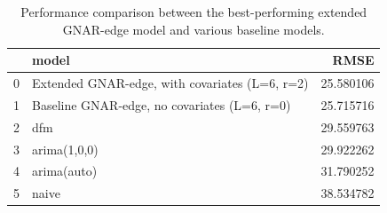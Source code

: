 \begin{table}
\caption{Performance comparison between the best-performing extended GNAR-edge model and various baseline models.}
\begin{tabular}{llr}
\toprule
 & model & RMSE \\
\midrule
0 & Extended GNAR-edge, with covariates (L=6, r=2) & 25.580106 \\
1 & Baseline GNAR-edge, no covariates (L=6, r=0) & 25.715716 \\
2 & dfm & 29.559763 \\
3 & arima(1,0,0) & 29.922262 \\
4 & arima(auto) & 31.790252 \\
5 & naive & 38.534782 \\
\bottomrule
\end{tabular}
\end{table}
